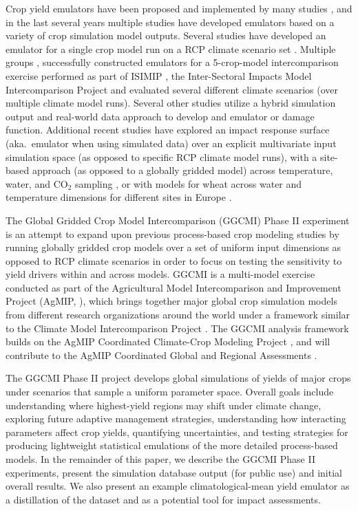 \documentclass[preprint, 5p, times, twocolumn]{elsarticle}
\begin{document}
Crop yield emulators have been proposed and implemented by many studies \citep[e.g.\ ][]{Howden2005, raisen2006, Lobell2010, Iizumi2010, Ferrise2011, Holzkamper2012, RUANE2013a, Markowski2015}, and in the last several years multiple studies have developed emulators based on a variety of crop simulation model outputs. Several studies have developed an emulator for a single crop model run on a RCP climate scenario set \citep[e.g.\ ][]{Oyebamiji15}. Multiple groups \citep[e.g.\ ][]{BLANC2015, BLANC2017, Ostberg2018}, successfully constructed emulators for a 5-crop-model intercomparison exercise performed as part of ISIMIP \citep{Warszawski3228}, the Inter-Sectoral Impacts Model Intercomparison Project and evaluated several different climate scenarios (over multiple climate model runs). Several other studies \citep[e.g.\ ][]{Moore2017, Mistry2017} utilize a hybrid simulation output and real-world data approach to develop and emulator or damage function. Additional recent studies have explored an impact response surface (aka.\ emulator when using simulated data) over an explicit multivariate input simulation space (as opposed to specific RCP climate model runs), with a site-based approach (as opposed to a globally gridded model) across temperature, water, and CO$_2$ sampling \citep{snyder2018}, or with models for wheat across water and temperature dimensions for different sites in Europe \citep{FRONZEK20182}. 

The Global Gridded Crop Model Intercomparison (GGCMI) Phase II experiment is an attempt to expand upon previous process-based crop modeling studies by running globally gridded crop models over a set of uniform input dimensions as opposed to RCP climate scenarios in order to focus on testing the sensitivity to yield drivers within and across models. GGCMI is a multi-model exercise conducted as part of the Agricultural Model Intercomparison and Improvement Project (AgMIP, \citep{ROSENZWEIG2013, Rosenzweig2014}), which brings together major global crop simulation models from different research organizations around the world under a framework similar to the Climate Model Intercomparison Project \citep[CMIP,~][]{Taylor2012, Eyring2016}. The GGCMI analysis framework builds on the AgMIP Coordinated Climate-Crop Modeling Project \citep[C3MP,~][]{ruane2014, mcdermid2015}, and will contribute to the AgMIP Coordinated Global and Regional Assessments \citep[CGRA,~][]{ruane2018, rosenzweig2018}. 

The GGCMI Phase II project develops global simulations of yields of major crops under scenarios that sample a uniform parameter space. Overall goals include understanding where highest-yield regions may shift under climate change, exploring future adaptive management strategies, understanding how interacting parameters affect crop yields, quantifying uncertainties, and testing strategies for producing lightweight statistical emulations of the more detailed process-based models. In the remainder of this paper, we describe the GGCMI Phase II experiments, present the simulation database output (for public use) and initial overall results. We also present an example climatological-mean yield emulator as a distillation of the dataset and as a potential tool for impact assessments. 
\end{document}
